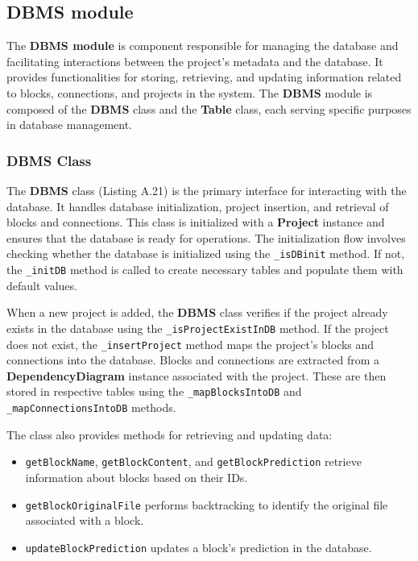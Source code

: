 \subsection{DBMS module}

The \textbf{DBMS module} is component responsible for managing the database and facilitating interactions between the project's metadata and the database. It provides functionalities for storing, retrieving, and updating information related to blocks, connections, and projects in the system. The \textbf{DBMS} module is composed of the \textbf{DBMS} class and the \textbf{Table} class, each serving specific purposes in database management.

\subsubsection{DBMS Class}

The \textbf{DBMS} class (Listing A.21) is the primary interface for interacting with the database. It handles database initialization, project insertion, and retrieval of blocks and connections. This class is initialized with a \textbf{Project} instance and ensures that the database is ready for operations. The initialization flow involves checking whether the database is initialized using the \texttt{\_isDBinit} method. If not, the \texttt{\_initDB} method is called to create necessary tables and populate them with default values.

When a new project is added, the \textbf{DBMS} class verifies if the project already exists in the database using the \texttt{\_isProjectExistInDB} method. If the project does not exist, the \texttt{\_insertProject} method maps the project's blocks and connections into the database. Blocks and connections are extracted from a \textbf{DependencyDiagram} instance associated with the project. These are then stored in respective tables using the \texttt{\_mapBlocksIntoDB} and \texttt{\_mapConnectionsIntoDB} methods.

The class also provides methods for retrieving and updating data:
\begin{itemize}
    \item \texttt{getBlockName}, \texttt{getBlockContent}, and \texttt{getBlockPrediction} retrieve information about blocks based on their IDs.
    \item \texttt{getBlockOriginalFile} performs backtracking to identify the original file associated with a block.
    \item \texttt{updateBlockPrediction} updates a block's prediction in the database.
\end{itemize}

